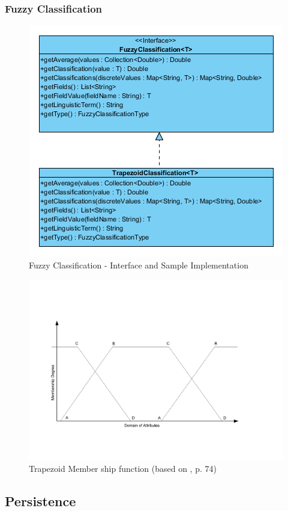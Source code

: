\documentclass[a4paper]{article}
\begin{document}
\subsubsection{Fuzzy Classification}
\begin{figure}[h!]
	\centering
	\includegraphics[scale=2.5]{images/uml_fuzzy.png}
	\caption{Fuzzy Classification - Interface and Sample Implementation}
	\label{uml_fuzzy}
\end{figure}
\begin{figure}[h!]
	\centering
	\includegraphics[scale=0.5]{images/trapezoid.pdf}
	\caption{Trapezoid Member ship function (based on \cite{faseld2012}, p. 74)}
	\label{trapezoid_functions}
\end{figure}
\subsection{Persistence}
\end{document}
